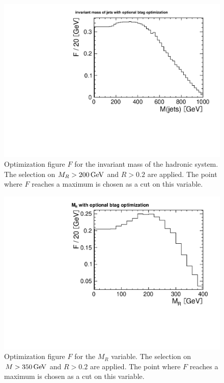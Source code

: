 \begin{figure}[phtb]
    \centering
    \includegraphics[width=\textwidth]{images/pdf/cut_opt_had_mass_optional_btag_4jets_AND_mr200_AND_r02}
    \caption{Optimization figure $F$ for the invariant mass of the hadronic
        system. The selection on $M_R > \unit[200]{GeV}$ and $R > 0.2$ are
    applied. The point where $F$ reaches a maximum is chosen as a cut on this variable.}
    \label{fig:opt_had_mass}
\end{figure}
\begin{figure}[phtb]
    \centering
    \includegraphics[width=\textwidth]{images/pdf/cut_opt_mr_optional_btag_4jets_AND_r02_AND_had_mass350}
    \caption{Optimization figure $F$ for the $M_R$ variable. The selection
        on $M > \unit[350]{GeV}$ and $R > 0.2$ are
    applied. The point where $F$ reaches a maximum is chosen as a cut on this variable.}
    \label{fig:opt_mr}
\end{figure}
